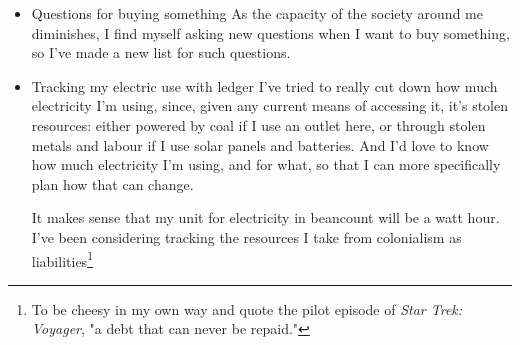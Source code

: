\documentclass[11pt]{article}
\begin{document}
\begin{itemize}
So it's important to my sense of survival to try and personally move out of resource overshoot. But it's hard to know how much resources I'm using if I don't keep track of it. And in many ways, what we use is obfuscated.\footnote{An interesting piece of information that seems relevant: while FEMA recommends people keep 1 gallon of water around for each day they expect to be without water service, the average U.S. resident uses 80-100 gallons a day. That's a big discrepancy.}

One important part of liberatory praxis is making spaces that are liberated. In the heartland of the kyriarchy, with all its infrastructure, it is hard to make spaces that aren't in some ways dependent on that infrastructure. We all use the roads. And these days, those roads run into the bones of our house, bringing in energy, connectivity, water, and hauling away waste.

But these spaces can be reclaimed, in part, by\ldots{} I don't want to say "going off-grid," but\ldots{} Gloria Anzaldua talks about how the further you are from a border, the more clear and definitive the border looks. And things that are invisible, like our dependence on colonialism to have water come out of the faucet, seem very far away. So in the abstract, leaving colonialism, when you're completely enclaved by it, seems very easy. But as you try to cross the border, it becomes clear that what is seen as the border from far away is a lot murkier up close.

My hope is that by keeping a ledger, not only can I keep an eye on my resource overshoot (and think about ways to change that), but also by keeping an eye on when those resources come from colonialism (and think about ways to change that.)
\item Questions for buying something
\label{sec:org5494746}
As the capacity of the society around me diminishes, I find myself asking new questions when I want to buy something, so I've made a new list for such questions.
\item Tracking my electric use with ledger
\label{sec:orgb2aa778}
I've tried to really cut down how much electricity I'm using, since, given any current means of accessing it, it's stolen resources: either powered by coal if I use an outlet here, or through stolen metals and labour if I use solar panels and batteries. And I'd love to know how much electricity I'm using, and for what, so that I can more specifically plan how that can change.

It makes sense that my unit for electricity in beancount will be a watt hour. I've been considering tracking the resources I take from colonialism as liabilities\footnote{To be cheesy in my own way and quote the pilot episode of \emph{Star Trek: Voyager}, "a debt that can never be repaid."}
\end{itemize}
\end{document}
